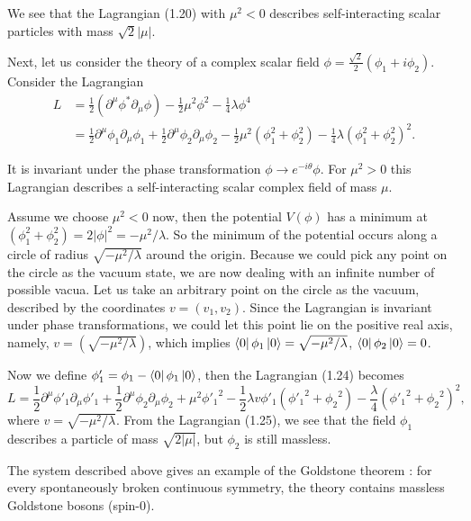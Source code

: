 We see that the Lagrangian (1.20) with $\mu^2<0$ describes self-interacting scalar particles with mass $\sqrt{2}|\mu|$. 




Next, let us consider the theory of a complex scalar field $\phi =\frac{\sqrt{2}}{2}(\phi_1+i\phi_2)$. Consider the Lagrangian
\begin{align}
L&=\frac{1}{2}(\partial^\mu \phi^{\ast} \partial_\mu \phi)-\frac{1}{2}\mu^2\phi^2-\frac{1}{4}\lambda\phi^4\nonumber\\
&=\frac{1}{2}\partial^\mu\phi_1\partial_\mu\phi_1+\frac{1}{2}\partial^\mu\phi_2\partial_\mu\phi_2-\frac{1}{2}\mu^2(\phi_1^2+\phi_2^2)-\frac{1}{4}\lambda(\phi_1^2+\phi_2^2)^2.
\end{align}

It is invariant under the phase transformation $\phi \to e^{-i\theta}\phi$. For $\mu^2>0$ this Lagrangian describes a self-interacting scalar complex field of mass $\mu$. 

Assume we choose $\mu^2<0$ now, then the potential $V(\phi)$ has a minimum at $(\phi_1^2+\phi_2^2)=2|\phi|^2=-\mu^2/\lambda$. So the minimum of the potential occurs along a circle of radius $\sqrt{-\mu^2/\lambda}$ around the origin. Because we could pick any point on the circle as the vacuum state, we are now dealing with an infinite number of possible vacua. Let us take an arbitrary point on the circle as the vacuum, described by the coordinates $v=(v_1,v_2)$. Since the Lagrangian is invariant under phase transformations, we could let this point lie on the 
positive real axis, namely, $v=(\sqrt{-\mu^2/\lambda})$, which implies $\Bra{0}\phi_1\Ket{0}=\sqrt{-\mu^2/\lambda}$, $\Bra{0}\phi_2\Ket{0}=0$.

Now we define $\phi_1'=\phi_1-\Bra{0}\phi_1\Ket{0}$, then the Lagrangian (1.24) becomes
\begin{equation}
L=\frac{1}{2}\partial^\mu\phi'_1\partial_\mu\phi'_1+\frac{1}{2}\partial^\mu\phi_2\partial_\mu\phi_2+\mu^2{\phi'_1}^2-\frac{1}{2}\lambda v\phi'_1({\phi'_1}^2+{\phi_2}^2)-\frac{\lambda}{4}({\phi'_1}^2+{\phi_2}^2)^2,
\end{equation}
where $v=\sqrt{-\mu^2/\lambda}$. From the Lagrangian (1.25), we see that the field $\phi_1$ describes a particle of mass $\sqrt{2|\mu|}$, but $\phi_2$ is still massless.

The system described above gives an example of the Goldstone theorem \cite{Nambu,NambuLasinio1,NambuLasinio2,Goldstone,Bludman}: for every spontaneously broken continuous symmetry, the theory contains massless Goldstone bosons (spin-$0$).

